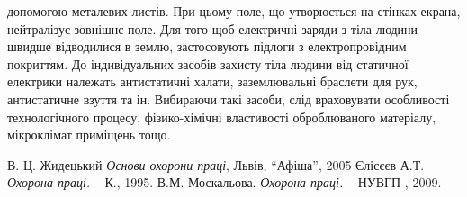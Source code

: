 \documentclass[14pt]{extarticle} %
\begin{document}
допомогою металевих листів. При цьому поле, що утворюється на стінках екрана,
нейтралізує зовнішнє поле. Для того щоб електричні заряди з тіла людини швидше
відводилися в землю, застосовують підлоги з електропровідним покриттям. До
індивідуальних засобів захисту тіла людини від статичної електрики належать
антистатичні халати, заземлювальні браслети для рук, антистатичне взуття та ін.
Вибираючи такі засоби, слід враховувати особливості технологічного процесу,
фізико-хімічні властивості оброблюваного матеріалу, мікроклімат приміщень тощо.
\begin{thebibliography}{9}
В. Ц. Жидецький {\em Основи охорони праці}, Львів, ``Афіша'', 2005
Єлісєєв А.Т. {\em Охорона праці.} -- К., 1995.
В.М. Москальова. {\em Охорона праці.} -- НУВГП , 2009.
\end{thebibliography}
\end{document}
